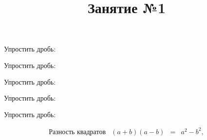 \title{Занятие №1}
\begin{listofex}
	\item Упростить дробь:
	\begin{enumcols}[itemcolumns=3]
		\item {}
		\item {}
		\item {}
		\item {}
		\item {}
		\item {}
	\end{enumcols}
	\item Упростить дробь:
	\begin{enumcols}[itemcolumns=4]
		\item {}
		\item {}
		\item {}
		\item {}
	\end{enumcols}
	\item Упростить дробь:
	\begin{enumcols}[itemcolumns=3]
		\item {}
		\item {}
		\item {}
		\item {}
		\item {}
	\end{enumcols}
	\item Упростить дробь:
	\begin{enumcols}[itemcolumns=5]
		\item {}
		\item {}
		\item {}
		\item {}
		\item {}
	\end{enumcols}
	\item Упростить дробь:
	\begin{enumcols}[itemcolumns=3]
		\item {}
		\item {}
		\item {}
	\end{enumcols}
	\[ \begin{array}{cccc}
		\text{Разность квадратов}&(a+b)(a-b)& =&a^2-b^2,\\

\end{array}\]
\end{listofex}
